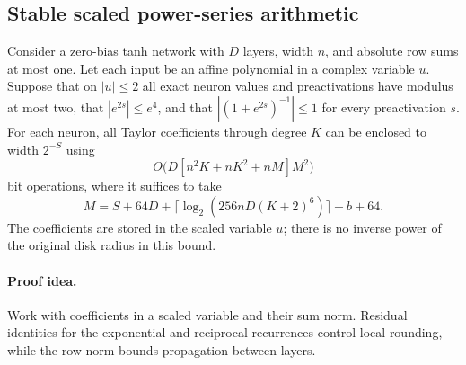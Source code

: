 \subsection{Stable scaled power-series arithmetic}
\label{sec:scaled-series}

\begin{lemma}
\label{lem:scaled-series-stability}
Consider a zero-bias tanh network with $D$ layers, width $n$, and
absolute row sums at most one. Let each input be an affine polynomial
in a complex variable $u$. Suppose that on $|u|\le2$ all exact neuron
values and preactivations have modulus at most two, that
$|e^{2s}|\le e^4$, and that $|(1+e^{2s})^{-1}|\le1$ for every
preactivation $s$. For each neuron, all Taylor coefficients through
degree $K$ can be enclosed to width $2^{-S}$ using
\[
 O\bigl(D[n^2K+nK^2+nM]M^2\bigr)
\]
bit operations, where it suffices to take
\[
 M=S+64D+\lceil\log_2(256nD(K+2)^6)\rceil+b+64.
\]
The coefficients are stored in the scaled variable $u$; there is no
inverse power of the original disk radius in this bound.
\end{lemma}
\paragraph{Proof idea.}
Work with coefficients in a scaled variable and their sum norm. Residual
identities for the exponential and reciprocal recurrences control local
rounding, while the row norm bounds propagation between layers.

